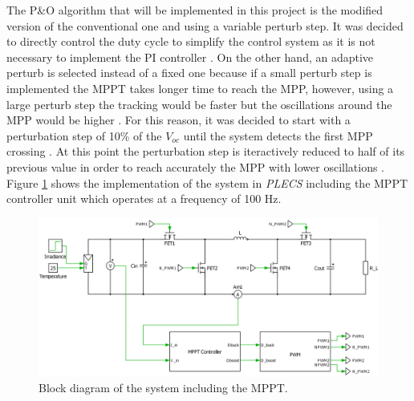 The P\&O algorithm that will be implemented in this project is the  modified version of the conventional one and using a variable perturb step. It was decided to directly control the duty cycle to simplify the control system as it is not necessary to implement the PI controller . On the other hand, an adaptive perturb is selected instead of a fixed one because if a small perturb step is implemented the MPPT takes longer time to reach the MPP, however, using a large perturb step the tracking would be faster but the oscillations around the MPP would be higher . For this reason, it was decided to start with a perturbation step of 10\% of the $V_{oc}$ until the system detects the first MPP crossing . At this point the perturbation step is iteractively reduced to half of its previous value in order to reach accurately the MPP with lower oscillations . Figure \ref{BD_POalgorithm} shows the implementation of the system in \textit{PLECS} including the MPPT controller unit which operates at a frequency of 100 Hz. 

\begin{figure}[H]
	\begin{center}
		\includegraphics[width=\textwidth]{../Pictures/BD_implementation_POalgorithm}
		\caption{Block diagram of the system including the MPPT.}
		\label{BD_POalgorithm}
	\end{center}	
\end{figure}

